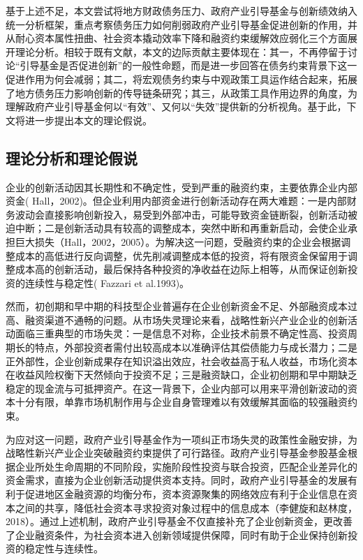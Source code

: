 基于上述不足，本文尝试将地方财政债务压力、政府产业引导基金与创新绩效纳入统一分析框架，重点考察债务压力如何削弱政府产业引导基金促进创新的作用，并从耐心资本属性扭曲、社会资本撬动效率下降和融资约束缓解效应弱化三个方面展开理论分析。相较于既有文献，本文的边际贡献主要体现在：其一，不再停留于讨论“引导基金是否促进创新”的一般性命题，而是进一步回答在债务约束背景下这一促进作用为何会减弱；其二，将宏观债务约束与中观政策工具运作结合起来，拓展了地方债务压力影响创新的传导链条研究；其三，从政策工具作用边界的角度，为理解政府产业引导基金何以“有效”、又何以“失效”提供新的分析视角。基于此，下文将进一步提出本文的理论假说。

\subsection{理论分析和理论假说}

企业的创新活动因其长期性和不确定性，受到严重的融资约束，主要依靠企业内部资金( Hall，2002)。但企业利用内部资金进行创新活动存在两大难题：一是内部财务波动会直接影响创新投入，易受到外部冲击，可能导致资金链断裂，创新活动被迫中断；二是创新活动具有较高的调整成本，突然中断和再重新启动，会使企业承担巨大损失（Hall，2002，2005）。为解决这一问题，受融资约束的企业会根据调整成本的高低进行反向调整，优先削减调整成本低的投资，将有限资金保留用于调整成本高的创新活动，最后保持各种投资的净收益在边际上相等，从而保证创新投资的连续性与稳定性( Fazzari et al.1993)。

然而，初创期和早中期的科技型企业普遍存在企业创新资金不足、外部融资成本过高、融资渠道不通畅的问题。从市场失灵理论来看，战略性新兴产业企业的创新活动面临三重典型的市场失灵：一是信息不对称，企业技术前景不确定性高、投资周期长的特点，外部投资者需付出较高成本以准确评估其偿债能力与成长潜力；二是正外部性，企业创新成果存在知识溢出效应，社会收益高于私人收益，市场化资本在收益风险权衡下天然倾向于投资不足；三是融资缺口，企业初创期和早中期缺乏稳定的现金流与可抵押资产。在这一背景下，企业内部可以用来平滑创新波动的资本十分有限，单靠市场机制作用与企业自身管理难以有效缓解其面临的较强融资约束。

为应对这一问题，政府产业引导基金作为一项纠正市场失灵的政策性金融安排，为战略性新兴产业企业突破融资约束提供了可行路径。政府产业引导基金参股基金根据企业所处生命周期的不同阶段，实施阶段性投资与联合投资，匹配企业差异化的资金需求，直接为企业创新活动提供资本支持。同时，政府产业引导基金的发展有利于促进地区金融资源的均衡分布，资本资源聚集的网络效应有利于企业信息在资本之间的共享，降低社会资本寻求投资对象过程中的信息成本（李健旋和赵林度，2018）。通过上述机制，政府产业引导基金不仅直接补充了企业创新资金，更改善了企业融资条件，为社会资本进入创新领域提供保障，同时有助于企业保持创新投资的稳定性与连续性。

